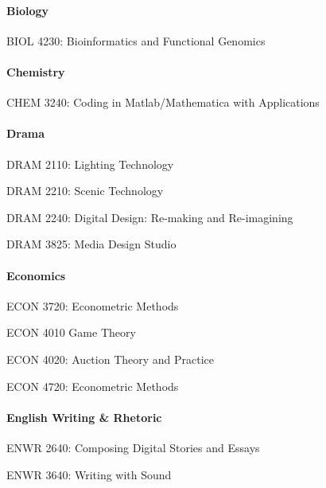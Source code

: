 \paragraph{Biology}
\begin{itemlist}
\item BIOL 4230: Bioinformatics and Functional Genomics
\end{itemlist}


\paragraph{Chemistry}
\begin{itemlist}
\item CHEM 3240: Coding in Matlab/Mathematica with Applications
\end{itemlist}


\paragraph{Drama}
\begin{itemlist}
\item DRAM 2110: Lighting Technology
\item DRAM 2210: Scenic Technology
\item DRAM 2240: Digital Design: Re-making and Re-imagining
\item DRAM 3825: Media Design Studio
\end{itemlist}


\paragraph{Economics}
\begin{itemlist}
\item ECON 3720: Econometric Methods 
\item ECON 4010 Game Theory
\item ECON 4020: Auction Theory and Practice
\item ECON 4720: Econometric Methods
\end{itemlist}

\paragraph{English Writing & Rhetoric}
\begin{itemlist}
\item ENWR 2640: Composing Digital Stories and Essays
\item ENWR 3640: Writing with Sound
\end{itemlist}

